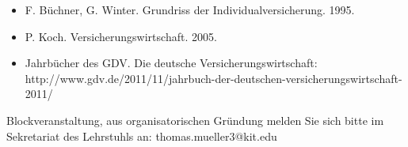 \begin{course}
\begin{literature}
 \begin{itemize}\item F. Büchner, G. Winter. Grundriss der Individualversicherung. 1995.  \item P. Koch. Versicherungswirtschaft. 2005.  \item Jahrbücher des GDV. Die deutsche Versicherungswirtschaft:\newline
http://www.gdv.de/2011/11/jahrbuch-der-deutschen-versicherungswirtschaft-2011/  \end{itemize}\end{literature}

\begin{remarks}Blockveranstaltung, aus organisatorischen Gründung melden Sie sich bitte im Sekretariat des Lehrstuhls an: thomas.mueller3@kit.edu

\end{remarks}

\end{course}